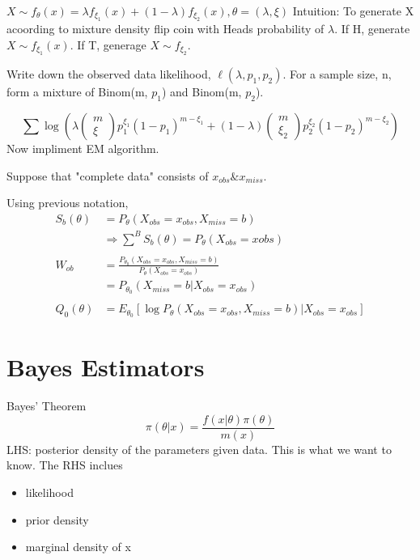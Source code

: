 \documentclass[11pt,fleqn]{book} %
\begin{document}
\begin{example}
	$X\sim f_\theta(x)=\lambda f_{\xi_1}(x)+(1-\lambda)f_{\xi_2}(x),  \theta=(\lambda, \xi) $
Intuition: To generate X acoording to mixture density flip coin with Heads probability of $\lambda$. If H, generate $X\sim f_{\xi_1}(x)$. If T, generage $X\sim f_{\xi_2} $. 

Write down the observed data likelihood, $\ell(\lambda, p_1, p_2)$. For a sample size, n, form a mixture of Binom(m, $p_1$) and Binom(m, $p_2$). 

$$\sum \log \left(\lambda \left(\begin{matrix} m \\ \xi \end{matrix}\right) p_1^{\xi_1}(1-p_1)^{m-\xi_1}+(1-\lambda)\left(\begin{matrix} m \\ \xi_2 \end{matrix}\right) p_2^{\xi_2}(1-p_2)^{m-\xi_2}\right) $$  
Now impliment EM algorithm.
\end{example}

Suppose that "complete data" consists of $x_{obs} \& x_{miss}$. 

Using previous notation, 
\begin{align*}
	S_b(\theta) &= P_\theta\left(X_{obs}=x_{obs}, X_{miss}=b \right)\\
	&\Rightarrow \sum^B S_b(\theta) = P_\theta\left(X_{obs}=x{obs} \right) \\
	\\
	W_{ob}&= \frac{P_{\theta_0}\left(X_{obs}=x_{obs}, X_{miss}=b \right)}{P_\theta\left(X_{obs}=x_{obs}\right)}\\ 
		&= P_{\theta_0}\left(X_{miss}=b|X_{obs}=x_{obs}\right)\\
		\\
	Q_0(\theta)&= E_{\theta_0}[\log P_\theta\left(X_{obs}=x_{obs}, X_{miss}=b\right)|X_{obs}=x_{obs}]	
\end{align*}

\section{Bayes Estimators}

\begin{theorem}{Bayes' Theorem}
$$\pi(\theta|x) = \frac{f(x|\theta)\pi(\theta)}{m(x)} $$
LHS: posterior density of the parameters given data. This is what we want to know. The RHS inclues
\begin{itemize}
	\item likelihood
	\item prior density
	\item marginal density of x
\end{itemize}
	
\end{theorem}
\end{document}
